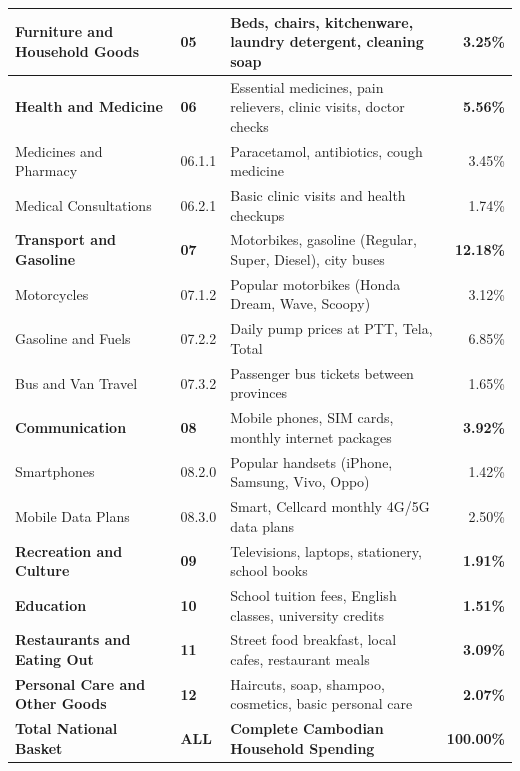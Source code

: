 \documentclass[11pt,a4paper,oneside]{article}
\begin{document}
\begin{longtable}{llp{7.5cm}r}
\midrule
\textbf{Furniture and Household Goods} & \textbf{05} & Beds, chairs, kitchenware, laundry detergent, cleaning soap & \textbf{3.25\%} \\
\midrule
\textbf{Health and Medicine} & \textbf{06} & Essential medicines, pain relievers, clinic visits, doctor checks & \textbf{5.56\%} \\
Medicines and Pharmacy & 06.1.1 & Paracetamol, antibiotics, cough medicine & 3.45\% \\
Medical Consultations & 06.2.1 & Basic clinic visits and health checkups & 1.74\% \\
\midrule
\textbf{Transport and Gasoline} & \textbf{07} & Motorbikes, gasoline (Regular, Super, Diesel), city buses & \textbf{12.18\%} \\
Motorcycles & 07.1.2 & Popular motorbikes (Honda Dream, Wave, Scoopy) & 3.12\% \\
Gasoline and Fuels & 07.2.2 & Daily pump prices at PTT, Tela, Total & 6.85\% \\
Bus and Van Travel & 07.3.2 & Passenger bus tickets between provinces & 1.65\% \\
\midrule
\textbf{Communication} & \textbf{08} & Mobile phones, SIM cards, monthly internet packages & \textbf{3.92\%} \\
Smartphones & 08.2.0 & Popular handsets (iPhone, Samsung, Vivo, Oppo) & 1.42\% \\
Mobile Data Plans & 08.3.0 & Smart, Cellcard monthly 4G/5G data plans & 2.50\% \\
\midrule
\textbf{Recreation and Culture} & \textbf{09} & Televisions, laptops, stationery, school books & \textbf{1.91\%} \\
\midrule
\textbf{Education} & \textbf{10} & School tuition fees, English classes, university credits & \textbf{1.51\%} \\
\midrule
\textbf{Restaurants and Eating Out} & \textbf{11} & Street food breakfast, local cafes, restaurant meals & \textbf{3.09\%} \\
\midrule
\textbf{Personal Care and Other Goods} & \textbf{12} & Haircuts, soap, shampoo, cosmetics, basic personal care & \textbf{2.07\%} \\
\midrule
\textbf{Total National Basket} & \textbf{ALL} & \textbf{Complete Cambodian Household Spending} & \textbf{100.00\%} \\
\bottomrule
\end{longtable}

\newpage

\end{document}
